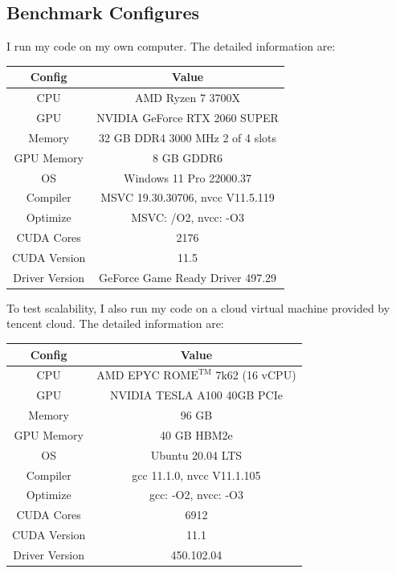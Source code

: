 \documentclass[10pt,twocolumn,letterpaper]{article}
\begin{document}
\subsection{Benchmark Configures}

I run my code on my own computer. The detailed information are:

\begin{table}[h]
\begin{tabular}{@{}c|c@{}}
\toprule
Config   & Value                                             \\ \midrule
CPU      & AMD Ryzen 7 3700X \\
GPU     &  NVIDIA GeForce RTX 2060 SUPER \\ 
Memory   & 32 GB DDR4 3000 MHz 2 of 4 slots                                            \\
GPU Memory & 8 GB GDDR6  \\
OS       & Windows 11 Pro 22000.37                                  \\
Compiler &  MSVC 19.30.30706, nvcc V11.5.119                                  \\
Optimize & MSVC: /O2, nvcc: -O3                                              \\ 
CUDA Cores   & 2176 \\
CUDA Version & 11.5 \\
Driver Version & GeForce Game Ready Driver 497.29 \\
\bottomrule
\end{tabular}
\end{table}

To test scalability, I also run my code on a cloud virtual machine provided by tencent cloud. The detailed information are:

\begin{table}[h]
\begin{tabular}{@{}c|c@{}}
\toprule
Config   & Value                                             \\ \midrule
CPU      &  AMD EPYC $\text{ROME}^{\text{TM}}$ 7k62 (16 vCPU) \\
GPU     &  NVIDIA TESLA A100 40GB PCIe \\ 
Memory   & 96 GB                                             \\
GPU Memory & 40 GB HBM2e  \\
OS       & Ubuntu 20.04 LTS                                  \\
Compiler &  gcc 11.1.0, nvcc V11.1.105                                  \\
Optimize & gcc: -O2, nvcc: -O3                                              \\ 
CUDA Cores   & 6912 \\
CUDA Version & 11.1 \\
Driver Version & 450.102.04 \\
\bottomrule
\end{tabular}
\end{table}
\end{document}

